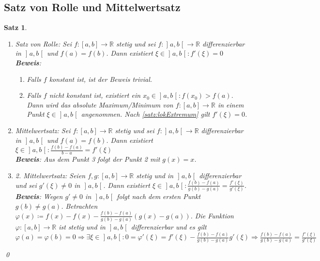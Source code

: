 \documentclass[ngerman,titlepage,twoside, parskip=half*]{scrreprt}
\newcommand*{\R}{\mathbb{R}}
\theoremstyle{plain}
\newtheorem{theorem}{Satz}[section]
\theoremstyle{definition}
\theoremstyle{remark}
\newcommand*{\bsofint}[1]{\mathopen{]}#1\mathclose{[}} %
\begin{document}
\subsection{Satz von Rolle und Mittelwertsatz}
\begin{theorem}
  \begin{enumerate}[(1)]
    \item Satz von Rolle: Sei $f\colon[a,b]\rightarrow\R$ stetig und sei $f\colon
      \bsofint{a,b}\rightarrow\R$ differenzierbar in $\bsofint{a,b}$ und $f(a)=f(b)$.
      Dann existiert $\xi\in \bsofint{a,b}\colon f'(\xi)=0$\\
      \textbf{Beweis}:\begin{enumerate}[1. F{a}ll]
	\item Falls $f$ konstant ist, ist der Beweis trivial.
	\item Falls $f$ nicht konstant ist, existiert ein $x_0\in
	  \bsofint{a,b}\colon f(x_0)>f(a)$. Dann wird das absolute Maximum/Minimum von
	  $f\colon[a,b]\rightarrow\R$ in einem Punkt $\xi\in\bsofint{a,b}$
	  angenommen. Nach \autoref{satz:lokExtremum} gilt $f'(\xi)=0$.
      \end{enumerate}
    \item Mittelwertsatz: Sei $f\colon[a,b]\rightarrow\R$ stetig und sei $f\colon
      \bsofint{a,b}\rightarrow\R$ differenzierbar in $\bsofint{a,b}$ und $f(a)=f(b)$. Dann
      existiert $\xi\in\bsofint{a,b}\colon\frac{f(b)-f(a)}{b-a}=f'(\xi)$\\
      \textbf{Beweis}: Aus dem Punkt 3 folgt der Punkt 2 mit $g(x)=x$.
    \item 2. Mittelwertsatz: Seien $f,g\colon[a,b]\rightarrow\R$ stetig und 
      in $\bsofint{a,b}$ differenzierbar und sei $g'(\xi)\neq 0$ in $\bsofint{a,b}$. 
      Dann existiert $\xi\in\bsofint{a,b}\colon\frac{f(b)-f(a)}{g(b)-g(a)}=
      \frac{f'(\xi)}{g'(\xi)}$.\\
      \textbf{Beweis}: Wegen $g'\neq 0$ in $\bsofint{a,b}$ folgt nach dem 
      ersten Punkt $g(b)\neq g(a)$. Betrachten $\varphi(x)\coloneqq f(x)-f(x)-
      \frac{f(b)-f(a)}{g(b)-g(a)}(g(x)-g(a))$. Die Funktion $\varphi\colon
      [a,b]\rightarrow\R$ ist stetig und in $\bsofint{a,b}$ differenzierbar und
      es gilt $\varphi (a)=\varphi(b)=0\Rightarrow \exists\xi\in\bsofint{a,b}\colon
      0=\varphi'(\xi)=f'(\xi)-\frac{f(b)-f(a)}{g(b)-g(a)}g'(\xi)
      \Rightarrow \frac{f(b)-f(a)}{g(b)-g(a)}=\frac{f'(\xi)}{g'(\xi)}$
  \end{enumerate}
  \qed
\end{theorem}
\end{document}
